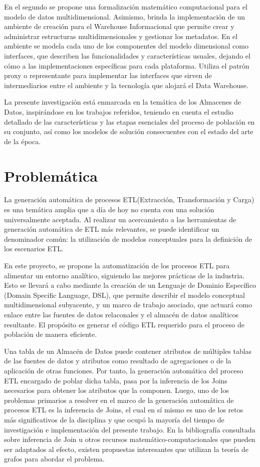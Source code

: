 En el segundo se propone una formalización matemático computacional para el modelo de datos multidimensional. Asimismo,
brinda la implementación de un ambiente de creación para el Warehouse Informacional que permite crear y administrar 
estructuras multidimensionales y gestionar los metadatos. En el ambiente se modela cada uno de los componentes del modelo 
dimensional como interfaces, que describen las funcionalidades y caracter\'isticas usuales, dejando el c\'omo a las 
implementaciones 
espec\'ificas para cada plataforma. Utiliza el patr\'on proxy o representante para implementar 
las interfaces que sirven de intermediarios entre el ambiente y la tecnología que alojar\'a el Data Warehouse.

La presente investigaci\'on est\'a enmarcada en la tem\'atica de los Almacenes de Datos, inspir\'andose en los trabajos 
referidos, teniendo en cuenta el estudio detallado de las características y  las etapas esenciales del proceso de 
población en su conjunto, así como los modelos de solución consecuentes con el estado del arte de la época.


\section{Problem\'atica}

La generaci\'on autom\'atica de procesos ETL(Extracción, Transformación y Carga) es una tem\'atica amplia que a d\'ia de hoy no cuenta con una soluci\'on 
universalmente aceptada. Al realizar un acercamiento a las herramientas de generación automática de ETL más relevantes, se puede
identificar un denominador común: la utilización de modelos conceptuales para la definición de los
escenarios ETL.

En este proyecto, se propone la automatización de los procesos ETL para alimentar un entorno analítico, siguiendo 
las mejores prácticas de la industria. Esto se llevará a cabo mediante la creación de un Lenguaje de Dominio 
Específico (Domain Specific Language, DSL), que permite describir el modelo conceptual multidimensional subyacente, 
y un marco de trabajo asociado, que actuará como enlace entre las fuentes de datos relaconales y el almacén de datos 
analíticos resultante. El propósito es generar el código ETL requerido para el 
proceso de población de manera eficiente.

Una tabla de un Almacén de Datos puede contener atributos de m\'ultiples tablas de las fuentes de datos y 
atributos como resultado de agregaciones o de la aplicaci\'on de otras funciones. Por tanto, la generaci\'on autom\'atica 
del proceso ETL encargado de poblar dicha tabla, pasa por la inferencia de los Joins necesarios para obtener los atributos 
que la componen. Luego, uno de los problemas primarios a resolver en 
el marco de la generaci\'on autom\'atica de procesos ETL es la inferencia de Joins, el cual en s\'i mismo es uno de 
los retos m\'as significativos de la disciplina y que ocup\'o la mayor\'ia del tiempo de investigación e implementación 
del presente trabajo. En la bibliografía consultada sobre inferencia de Join u otros recursos matemático-computacionales 
que pueden ser adaptados al efecto, existen propuestas interesantes que utilizan la teor\'ia de grafos para abordar 
el problema. 


